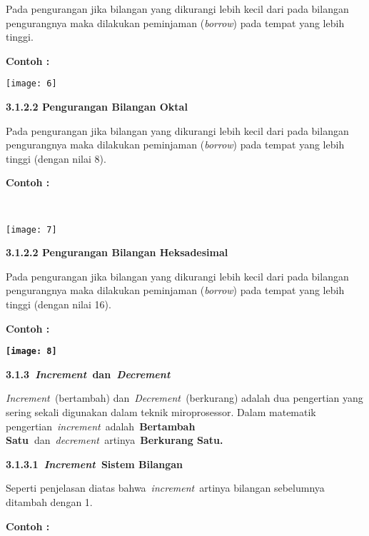 \documentclass[11pt,fleqn]{book} %
\begin{document}
Pada pengurangan jika bilangan yang dikurangi lebih kecil dari pada bilangan pengurangnya maka dilakukan peminjaman (\textit{borrow}) pada tempat yang lebih tinggi.

\noindent \textbf{Contoh :}

\begin{center}
\noindent \texttt{[image: 6]}
\end{center}

\noindent 

\noindent \textbf{3.1.2.2 Pengurangan Bilangan Oktal}

Pada pengurangan jika bilangan yang dikurangi lebih kecil dari pada bilangan pengurangnya maka dilakukan peminjaman (\textit{borrow}) pada tempat yang lebih tinggi (dengan nilai 8).

\noindent \textbf{Contoh :}

\noindent \textbf{~}

\begin{center} 
\texttt{[image: 7]} 
\end{center}

\textbf{3.1.2.2 Pengurangan Bilangan Heksadesimal}

Pada pengurangan jika bilangan yang dikurangi lebih kecil dari pada bilangan pengurangnya maka dilakukan peminjaman (\textit{borrow}) pada tempat yang lebih tinggi (dengan nilai 16).

\noindent \textbf{Contoh :}

\begin{center}
\noindent \textbf{\texttt{[image: 8]}}
\end{center}

\noindent 

\noindent \textbf{3.1.3~\textit{Increment~}dan~\textit{Decrement}}

\textit{Increment~}(bertambah) dan~\textit{Decrement~}(berkurang) adalah dua pengertian yang sering sekali digunakan dalam teknik miroprosessor. Dalam matematik pengertian~\textit{increment}~adalah~\textbf{Bertambah Satu~}dan~\textit{decrement~}artinya~\textbf{Berkurang Satu.}

\noindent \textbf{3.1.3.1~\textit{Increment~}Sistem Bilangan}

Seperti penjelasan diatas bahwa~\textit{increment}~artinya bilangan sebelumnya ditambah dengan 1.

\noindent \textbf{Contoh :}
\end{document}
